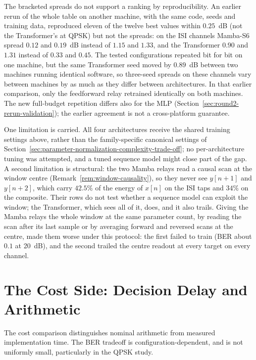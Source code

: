 The bracketed spreads do not support a ranking by reproducibility. An earlier rerun of the whole table on another machine, with the same code, seeds and training data, reproduced eleven of the twelve best values within $0.25$~dB (not the Transformer's at QPSK) but not the spreads: on the ISI channels Mamba-S6 spread $0.12$ and $0.19$~dB instead of $1.15$ and $1.33$, and the Transformer $0.90$ and $1.31$ instead of $0.33$ and $0.45$. The tested configurations repeated bit for bit on one machine, but the same Transformer seed moved by $0.89$~dB between two machines running identical software, so three-seed spreads on these channels vary between machines by as much as they differ between architectures. In that earlier comparison, only the feedforward relay retrained identically on both machines. The new full-budget repetition differs also for the MLP (Section~\ref{sec:round2-rerun-validation}); the earlier agreement is not a cross-platform guarantee.

One limitation is carried. All four architectures receive the shared training settings above, rather than the family-specific canonical settings of Section~\ref{sec:parameter-normalization-complexity-trade-off}; no per-architecture tuning was attempted, and a tuned sequence model might close part of the gap. A second limitation is structural: the two Mamba relays read a causal scan at the window centre (Remark~\ref{rem:window-causality}), so they never see $y[n+1]$ and $y[n+2]$, which carry $42.5\%$ of the energy of $x[n]$ on the ISI taps and $34\%$ on the composite. Their rows do not test whether a sequence model can exploit the window; the Transformer, which sees all of it, does, and it also trails. Giving the Mamba relays the whole window at the same parameter count, by reading the scan after its last sample or by averaging forward and reversed scans at the centre, made them worse under this protocol: the first failed to train (BER about $0.1$ at 20~dB), and the second trailed the centre readout at every target on every channel.

\section{The Cost Side: Decision Delay and Arithmetic}\label{sec:complexity-viterbi-mlp}

The cost comparison distinguishes nominal arithmetic from measured implementation time. The BER tradeoff is configuration-dependent, and is not uniformly small, particularly in the QPSK study.

